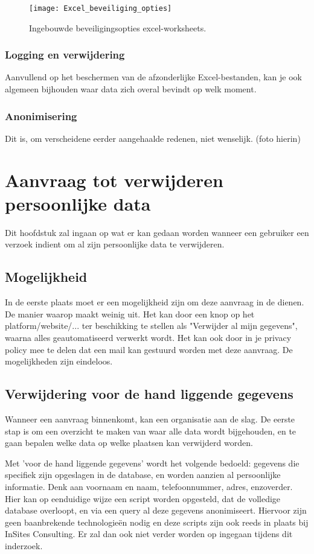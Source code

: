 \begin{figure}[h]
	\centering
	\texttt{[image: Excel\_beveiliging\_opties]}
	\label{fig:excelbeveiliging}
	\caption{Ingebouwde beveiligingsopties excel-worksheets.}
\end{figure}


\subsubsection{Logging en verwijdering}
Aanvullend op het beschermen van de afzonderlijke Excel-bestanden, kan je ook algemeen bijhouden waar data zich overal bevindt op welk moment. 

\subsubsection{Anonimisering}
 Dit is, om verscheidene eerder aangehaalde redenen, niet wenselijk. 
(foto hierin)

\section{Aanvraag tot verwijderen persoonlijke data}

Dit hoofdstuk zal ingaan op wat er kan gedaan worden wanneer een gebruiker een verzoek indient om al zijn persoonlijke data te verwijderen. 

\subsection{Mogelijkheid}
In de eerste plaats moet er een mogelijkheid zijn om deze aanvraag in de dienen. De manier waarop maakt weinig uit. Het kan door een knop op het platform/website/... ter beschikking te stellen als "Verwijder al mijn gegevens", waarna alles geautomatiseerd verwerkt wordt. Het kan ook door in je privacy policy mee te delen dat een mail kan gestuurd worden met deze aanvraag. De mogelijkheden zijn eindeloos. 

\subsection{Verwijdering voor de hand liggende gegevens}
Wanneer een aanvraag binnenkomt, kan een organisatie aan de slag. De eerste stap is om een overzicht te maken van waar alle data wordt bijgehouden, en te gaan bepalen welke data op welke plaatsen kan verwijderd worden. 


Met 'voor de hand liggende gegevens' wordt het volgende bedoeld: gegevens die specifiek zijn opgeslagen in de database, en worden aanzien al persoonlijke informatie. Denk aan voornaam en naam, telefoonnummer, adres, enzoverder. \\ 
Hier kan op eenduidige wijze een script worden opgesteld, dat de volledige database overloopt, en via een query al deze gegevens anonimiseert. Hiervoor zijn geen baanbrekende technologieën nodig en deze scripts zijn ook reeds in plaats bij InSites Consulting. Er zal dan ook niet verder worden op ingegaan tijdens dit inderzoek. 
 
